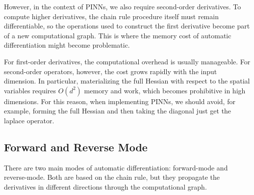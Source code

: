 %
%
However, in the context of PINNs, we also require second-order derivatives.
To compute higher derivatives, the chain rule procedure itself must remain differentiable, so the operations used to construct the first derivative become part of a new computational graph.
This is where the memory cost of automatic differentiation might become problematic.

For first-order derivatives, the computational overhead is usually manageable.
For second-order operators, however, the cost grows rapidly with the input dimension.
In particular, materializing the full Hessian with respect to the spatial variables requires $O(d^2)$ memory and work, which becomes prohibitive in high dimensions.
For this reason, when implementing PINNs, we should avoid, for example, forming the full Hessian and then taking the diagonal just get the laplace operator.

%
%
%
%
%
%


\subsection{Forward and Reverse Mode}

There are two main modes of automatic differentiation: forward-mode and reverse-mode.
Both are based on the chain rule, but they propagate the derivatives in different directions through the computational graph.\cite{goodfellow}


